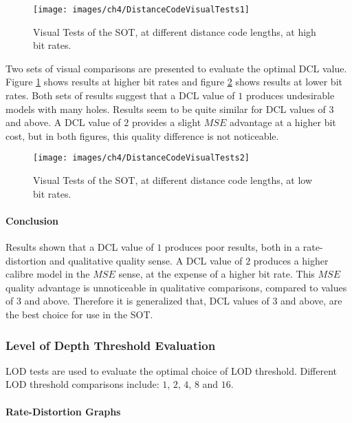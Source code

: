 \begin{figure}[!h]
\centering
\texttt{[image: images/ch4/DistanceCodeVisualTests1]}
\caption{Visual Tests of the SOT, at different distance code lengths, at high bit rates.}
\label{DistanceCodeVisualTests1}
\end{figure}

Two sets of visual comparisons are presented to evaluate the optimal DCL value. Figure \ref{DistanceCodeVisualTests1} shows results at higher bit rates and figure \ref{DistanceCodeVisualTests2} shows results at lower bit rates. Both sets of results suggest that a DCL value of $1$ produces undesirable models with many holes. Results seem to be quite similar for DCL values of $3$ and above. A DCL value of $2$ provides a slight $MSE$ advantage at a higher bit cost, but in both figures, this quality difference is not noticeable.

\begin{figure}[!h]
\centering
\texttt{[image: images/ch4/DistanceCodeVisualTests2]}
\caption{Visual Tests of the SOT, at different distance code lengths, at low bit rates.}
\label{DistanceCodeVisualTests2}
\end{figure}

\paragraph{Conclusion}

Results shown that a DCL value of $1$ produces poor results, both in a rate-distortion and qualitative quality sense. A DCL value of $2$ produces a higher calibre model in the $MSE$ sense, at the expense of a higher bit rate. This $MSE$ quality advantage is unnoticeable in qualitative comparisons, compared to values of $3$ and above. Therefore it is generalized that, DCL values of $3$ and above, are the best choice for use in the SOT.

\subsubsection{Level of Depth Threshold Evaluation}

LOD tests are used to evaluate the optimal choice of LOD threshold. Different LOD threshold comparisons include: $1$, $2$, $4$, $8$ and $16$.

\paragraph{Rate-Distortion Graphs}

